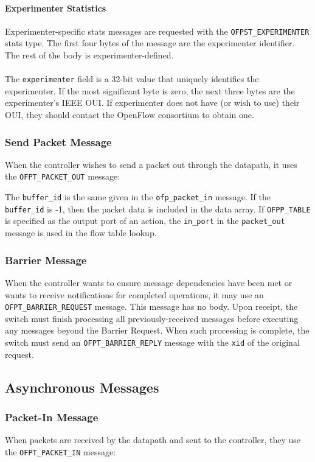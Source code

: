\paragraph{Experimenter Statistics}
Experimenter-specific stats messages are requested with the \verb|OFPST_EXPERIMENTER| stats type. The first four bytes of the message are the experimenter identifier. The rest of the body is experimenter-defined.
\\\\
The \verb|experimenter| field is a 32-bit value that uniquely identifies the experimenter. If the most significant byte is zero, the next three bytes are the experimenter's IEEE OUI. If experimenter does not have (or wish to use) their OUI, they should contact the OpenFlow consortium to obtain one. 

\subsubsection{Send Packet Message}
When the controller wishes to send a packet out through the datapath, it uses the \verb|OFPT_PACKET_OUT| message:


The \verb|buffer_id| is the same given in the \verb|ofp_packet_in| message.  If the \verb|buffer_id| is -1, then the packet data is included in the data array. If \verb|OFPP_TABLE| is specified as the output port of an action, the \verb|in_port| in the \verb|packet_out| message is used in the flow table lookup.

\subsubsection{Barrier Message}
When the controller wants to ensure message dependencies have been met or wants to receive notifications for completed operations, it may use an \verb|OFPT_BARRIER_REQUEST| message.  This message has no body.  Upon receipt, the switch must finish processing all previously-received messages before executing any messages beyond the Barrier Request.  When such processing is complete, the switch must send an \verb|OFPT_BARRIER_REPLY| message with the \verb|xid| of the original request.

\subsection{Asynchronous Messages}
\subsubsection{Packet-In Message}
When packets are received by the datapath and sent to the controller, they use the \verb|OFPT_PACKET_IN| message:

